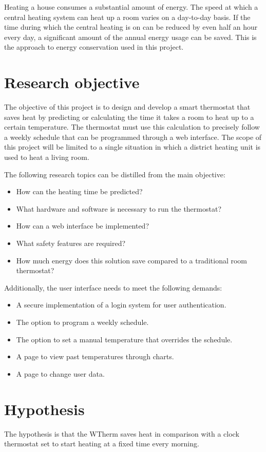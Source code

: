 \documentclass[12pt,a4paper,final]{report}
\begin{document}
Heating a house consumes a substantial amount of energy. The speed at which a central heating system can heat up a room varies on a day-to-day basis. If the time during which the central heating is on can be reduced by even half an hour every day, a significant amount of the annual energy usage can be saved. This is the approach to energy conservation used in this project.

\chapter*{Research objective} \label{chap:ResearchObjective}
The objective of this project is to design and develop a smart thermostat that saves heat by predicting or calculating the time it takes a room to heat up to a certain temperature. The thermostat must use this calculation to precisely follow a weekly schedule that can be programmed through a web interface. The scope of this project will be limited to a single situation in which a district heating unit is used to heat a living room.

The following research topics can be distilled from the main objective:
\begin{itemize}
	\item How can the heating time be predicted?
	\item What hardware and software is necessary to run the thermostat?
	\item How can a web interface be implemented?
	\item What safety features are required?
	\item How much energy does this solution save compared to a traditional room thermostat?
\end{itemize}

Additionally, the user interface needs to meet the following demands:
\begin{itemize}
	\item A secure implementation of a login system for user authentication.
	\item The option to program a weekly schedule.
	\item The option to set a manual temperature that overrides the schedule.
	\item A page to view past temperatures through charts.
	\item A page to change user data.
\end{itemize}

\chapter*{Hypothesis}
The hypothesis is that the WTherm saves heat in comparison with a clock thermostat set to start heating at a fixed time every morning.
\end{document}
